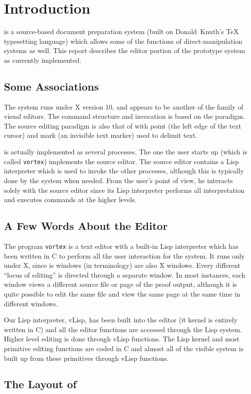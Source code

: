 \section{Introduction}

{\VorTeX} is a source-based document preparation system (built on
Donald~Knuth's {\TeX} typesetting language) which allows
some of the functions of direct-manipulation systems as well.  This
report describes the editor portion of the prototype system as currently
implemented.

\subsection{Some Associations}

The system runs under X version 10, and appears to be another of the
{\EMACS} family of visual editors.  The command
structure and invocation is based on the {\EMACS} paradigm.  The
source editing paradigm is also that of {\EMACS} with point (the left
edge of the text cursor) and mark (an invisible text marker) used to
delimit text.

{\VorTeX} is actually implemented as several processes.  The one the
user starts up (which is called {\tt vortex}) implements the source
editor.  The source editor contains a Lisp interpreter which is used
to invoke the other processes, although this is typically done by the
system when needed.  From the user's point of view, he interacts
solely with the source editor since its Lisp interpreter performs all
interpretation and executes commands at the higher levels.

\subsection{A Few Words About the Editor}

The program {\tt vortex} is a text editor with a built-in Lisp interpreter
which has been written in C to perform all the user interaction for the
{\VorTeX} system.  It runs only under X, since is windows (in {\EMACS}
terminology) are also X windows.  Every different ``locus of editing''
is directed through a separate window.  In most instances, each window
views a different source file or page of the proof output, although it
is quite possible to edit the same file and view the same page at the
same time in different windows.

Our Lisp interpreter, vLisp, has been built into the editor (it kernel is
entirely written in C) and all the editor functions are accessed through
the Lisp system.  Higher level editing is done through vLisp functions.
The Lisp kernel and most primitive editing functions are coded in C and
almost all of the visible system is built up from these primitives through
vLisp functions.

\subsection{The Layout of \VorTeX}

\centerline{}
